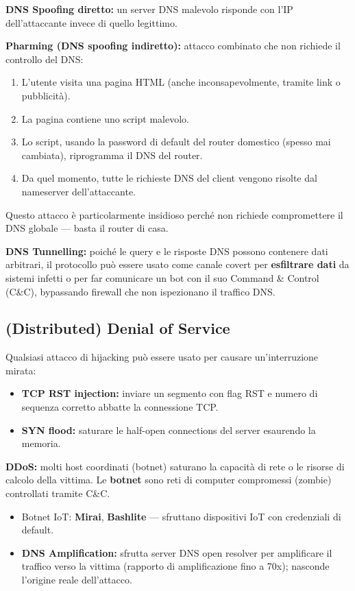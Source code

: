 \documentclass[12pt, a4paper]{report}
\begin{document}
\textbf{DNS Spoofing diretto:} un server DNS malevolo risponde con l'IP dell'attaccante invece di quello legittimo.

\textbf{Pharming (DNS spoofing indiretto):} attacco combinato che non richiede il controllo del DNS:
\begin{enumerate}
	\item L'utente visita una pagina HTML (anche inconsapevolmente, tramite link o pubblicità).
	\item La pagina contiene uno script malevolo.
	\item Lo script, usando la password di default del router domestico (spesso mai cambiata), riprogramma il DNS del router.
	\item Da quel momento, tutte le richieste DNS del client vengono risolte dal nameserver dell'attaccante.
\end{enumerate}

Questo attacco è particolarmente insidioso perché non richiede compromettere il DNS globale — basta il router di casa.

\textbf{DNS Tunnelling:} poiché le query e le risposte DNS possono contenere dati arbitrari, il protocollo può essere usato come canale covert per \textbf{esfiltrare dati} da sistemi infetti o per far comunicare un bot con il suo Command \& Control (C\&C), bypassando firewall che non ispezionano il traffico DNS.

\subsection{(Distributed) Denial of Service}
Qualsiasi attacco di hijacking può essere usato per causare un'interruzione mirata:
\begin{itemize}
	\item \textbf{TCP RST injection:} inviare un segmento con flag RST e numero di sequenza corretto abbatte la connessione TCP.
	\item \textbf{SYN flood:} saturare le half-open connections del server esaurendo la memoria.
\end{itemize}

\textbf{DDoS:} molti host coordinati (botnet) saturano la capacità di rete o le risorse di calcolo della vittima. Le \textbf{botnet} sono reti di computer compromessi (zombie) controllati tramite C\&C.
\begin{itemize}
	\item Botnet IoT: \textbf{Mirai}, \textbf{Bashlite} — sfruttano dispositivi IoT con credenziali di default.
	\item \textbf{DNS Amplification:} sfrutta server DNS open resolver per amplificare il traffico verso la vittima (rapporto di amplificazione fino a 70x); nasconde l'origine reale dell'attacco.
\end{itemize}
\end{document}
